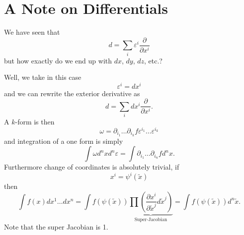 \appendix
\section{A Note on Differentials}

We have seen that
\begin{equation}
d = \sum_{i}\varepsilon^{i}\frac{\partial}{\partial x^i}
\end{equation}
but how exactly do we end up with $dx$, $dy$, $dz$, etc.?

Well, we take in this case
\begin{equation}
\varepsilon^i = dx^i
\end{equation}
and we can rewrite the exterior derivative as
\begin{equation}
d = \sum_{i}dx^{i}\frac{\partial}{\partial x^i}.
\end{equation}
A $k$-form is then
\begin{equation}
\omega = \partial_{i_1}\ldots\partial_{i_k}f\varepsilon^{i_1}\ldots\varepsilon^{i_k}
\end{equation}
and integration of a one form is simply
\begin{equation}
\int \omega d^nx d^n\varepsilon = \int \partial_{i_1}\ldots\partial_{i_n}fd^nx.
\end{equation}
Furthermore change of coordinates is absolutely trivial, if
\begin{equation}
x^i = \psi^i(\tilde{x})
\end{equation}
then
\begin{equation}
\int f(x)dx^1\ldots dx^n = \int f(\psi(\tilde{x}))\underbrace{\prod(\frac{\partial x^i}{\partial\tilde{x}^j}d\tilde{x}^j)}_\textrm{Super-Jacobian} = \int f(\psi(\tilde{x}))d^{n}\tilde{x}.
\end{equation}
Note that the super Jacobian is 1.
